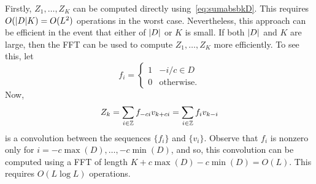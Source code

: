 \documentclass[journal]{IEEEtranTCOM}
\begin{document}
Firstly, $Z_1,\dots,Z_K$ can be computed directly using~\eqref{eq:sumabsbkD}.  This requires $O({\left\vert D \right\vert}K) = O(L^2)$ operations in the worst case. Nevertheless, this approach can be efficient in the event that either of ${\left\vert D \right\vert}$ or $K$ is small.  If both ${\left\vert D \right\vert}$ and $K$ are large, then the FFT can be used to compute $Z_1, \dots, Z_K$ more efficiently.  To see this, let
\[
f_i = \begin{cases}
1 & -i/c \in D \\
0 & \text{otherwise}.
\end{cases}
\] 
Now,
\[
Z_k = \sum_{i \in {\mathbb Z}} f_{-ci} v_{k+ci} = \sum_{i \in {\mathbb Z}} f_i v_{k-i}
\]
is a convolution between the sequences $\{f_{i}\}$ and $\{v_i\}$. Observe that $f_i$ is nonzero only for $i = -c\max(D), \dots, -c\min(D)$,
and so,
this convolution can be computed using a FFT of length $K + c\max(D) - c\min(D) = O(L)$.  This requires $O(L\log L)$ operations.

\end{document}
